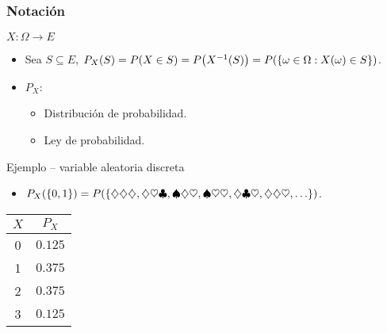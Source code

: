 \documentclass[table]{beamer}
\begin{document}
\begin{frame}
    \frametitle{Notación}
    \begin{block}{$X : \Omega \rightarrow E$}
        \begin{itemize}
            \item Sea $S \subseteq E$, $\pprob{X}{S} = \prob{X \in S} = \prob{X^{-1} \parens{S}} = \prob{\bparens{\omega \in \Omega : X \parens{\omega} \in S}}$.
            \item $P_{X}$:
                \begin{itemize}
                    \item Distribución de probabilidad.
                    \item Ley de probabilidad.
                \end{itemize}
        \end{itemize}
    \end{block}
    \begin{exampleblock}{Ejemplo -- variable aleatoria discreta}
        \begin{itemize}
            \item $\pprob{X}{\bparens{0, 1}} = \prob{\bparens{\diamondsuit \diamondsuit \diamondsuit, \diamondsuit \heartsuit \clubsuit, \spadesuit \diamondsuit \heartsuit, \spadesuit \heartsuit \heartsuit, \diamondsuit \clubsuit \heartsuit, \diamondsuit \diamondsuit \heartsuit , \ldots}}$.
        \end{itemize}
    \begin{center}
        \begin{tabular}{c|c}
            $X$ & $P_{X}$ \\
            \hline
            0 & $0.125$ \\
            1 & $0.375$ \\
            2 & $0.375$ \\
            3 & $0.125$
        \end{tabular}
    \end{center}
    \end{exampleblock}
\end{frame}
\end{document}
